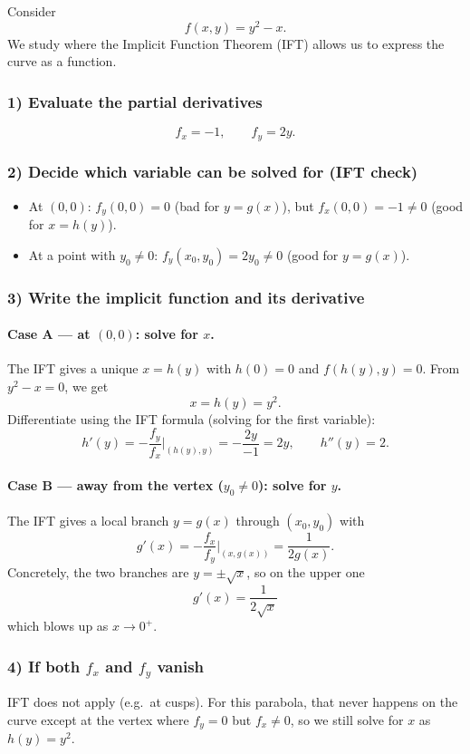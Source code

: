 \documentclass[12pt,a4paper]{article}
\theoremstyle{plain}
\theoremstyle{definition}
\theoremstyle{remark}
\theoremstyle{remark}
\begin{document}
	Consider 
	\[
	f(x,y) = y^2 - x.
	\]
	We study where the Implicit Function Theorem (IFT) allows us to express the curve as a function.
	
	\subsubsection*{1) Evaluate the partial derivatives}
	\[
	f_x = -1, 
	\qquad 
	f_y = 2y.
	\]
	
	\subsubsection*{2) Decide which variable can be solved for (IFT check)}
	
	\begin{itemize}
		\item At $(0,0)$: $f_y(0,0)=0$ (bad for $y=g(x)$), but $f_x(0,0)=-1\neq0$ (good for $x=h(y)$).
		\item At a point with $y_0\neq0$: $f_y(x_0,y_0)=2y_0\neq0$ (good for $y=g(x)$).
	\end{itemize}
	
	\subsubsection*{3) Write the implicit function and its derivative}
	
	\paragraph{Case A — at $(0,0)$: solve for $x$.}
	The IFT gives a unique $x=h(y)$ with $h(0)=0$ and $f(h(y),y)=0$.  
	From $y^2 - x = 0$, we get
	\[
	\boxed{x = h(y) = y^2.}
	\]
	Differentiate using the IFT formula (solving for the first variable):
	\[
	h'(y) = -\frac{f_y}{f_x}\Big|_{(h(y),y)} = -\frac{2y}{-1} = 2y,
	\qquad
	h''(y) = 2.
	\]
	
	\paragraph{Case B — away from the vertex ($y_0\neq 0$): solve for $y$.}
	The IFT gives a local branch $y=g(x)$ through $(x_0,y_0)$ with
	\[
	\boxed{g'(x) = -\frac{f_x}{f_y}\Big|_{(x,g(x))} = \frac{1}{2g(x)}.}
	\]
	Concretely, the two branches are $y=\pm\sqrt{x}$, so on the upper one
	\[
	g'(x) = \frac{1}{2\sqrt{x}}
	\]
	which blows up as $x\to 0^+$.
	
	\subsubsection*{4) If both $f_x$ and $f_y$ vanish}
	IFT does not apply (e.g.\ at cusps).  
	For this parabola, that never happens on the curve except at the vertex where 
	$f_y=0$ but $f_x\neq0$, so we still solve for $x$ as $h(y)=y^2$.
	
\end{document}
